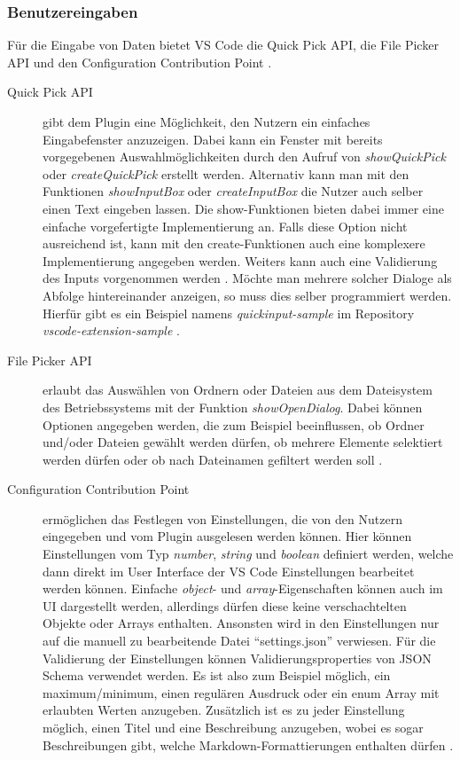 \subsubsection{Benutzereingaben}
\label{sec:FunktionalitätDerPluginAPI_Benutzereingaben}
  Für die Eingabe von Daten bietet VS Code die Quick Pick API, die File Picker API
  und den Configuration Contribution Point \cite{VSCodeExtensionAPICommonCapabilities}.
  \begin{description}
    \item[Quick Pick API] gibt dem Plugin eine Möglichkeit, den Nutzern ein einfaches Eingabefenster
      anzuzeigen. Dabei kann ein Fenster mit bereits vorgegebenen Auswahlmöglichkeiten durch
      den Aufruf von \emph{showQuickPick} oder \emph{createQuickPick} erstellt werden.
      Alternativ kann man mit den Funktionen \emph{showInputBox} oder \emph{createInputBox}
      die Nutzer auch selber einen Text eingeben lassen. Die show-Funktionen bieten dabei immer
      eine einfache vorgefertigte Implementierung an. Falls diese Option nicht ausreichend ist,
      kann mit den create-Funktionen auch eine komplexere Implementierung angegeben werden.
      Weiters kann auch eine Validierung des Inputs vorgenommen werden \cite{VSCodeExtensionAPIQuickPick}.
      Möchte man mehrere solcher Dialoge als Abfolge hintereinander anzeigen, so muss dies
      selber programmiert werden. Hierfür gibt es ein Beispiel namens \emph{quickinput-sample}
      \cite{VSCodeExtensionAPIQuickInputSample}
      im Repository \emph{vscode-extension-sample} \cite{VSCodeExtensionSamples}. 
    \item[File Picker API] erlaubt das Auswählen von Ordnern oder Dateien aus dem Dateisystem
      des Betriebssystems mit der Funktion \emph{showOpenDialog}. Dabei können Optionen angegeben
      werden, die zum Beispiel beeinflussen, ob Ordner und/oder Dateien gewählt werden dürfen, 
      ob mehrere Elemente selektiert werden dürfen oder ob nach Dateinamen gefiltert werden soll
      \cite{VSCodeExtensionAPIFilePicker}.
    \item[Configuration Contribution Point] ermöglichen das Festlegen von Einstellungen,
      die von den Nutzern eingegeben und vom Plugin ausgelesen werden können. Hier können
      Einstellungen vom Typ \emph{number}, \emph{string} und \emph{boolean} definiert werden, welche dann direkt
      im User Interface der VS Code Einstellungen bearbeitet werden können.
      Einfache \emph{object}- und \emph{array}-Eigenschaften können auch im UI dargestellt werden,
      allerdings dürfen diese keine verschachtelten Objekte oder Arrays enthalten.
      Ansonsten wird in den Einstellungen nur auf die manuell zu bearbeitende
      Datei \enquote{settings.json} verwiesen.
      Für die Validierung der Einstellungen können Validierungsproperties
      von JSON Schema verwendet werden. Es ist also zum Beispiel möglich,
      ein maximum/minimum, einen regulären Ausdruck oder ein enum Array
      mit erlaubten Werten anzugeben.
      Zusätzlich ist es zu jeder Einstellung möglich, einen Titel und eine Beschreibung
      anzugeben, wobei es sogar Beschreibungen gibt, welche Markdown-Formattierungen
      enthalten dürfen \cite{VSCodeExtensionAPIContributionPointsConfiguration}.
  \end{description}
